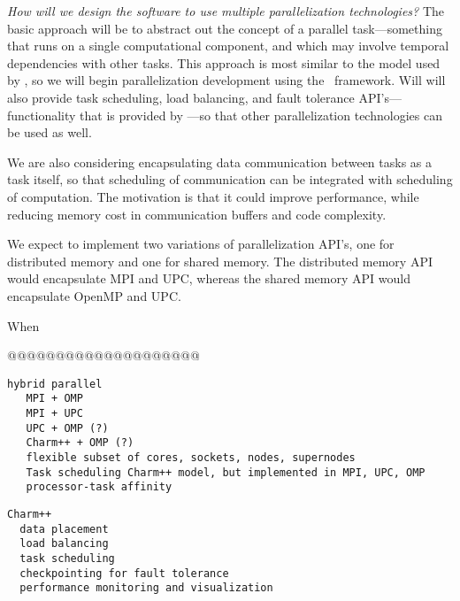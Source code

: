 \documentclass{article}
\begin{document}
\textit{How will we design the software to use multiple
  parallelization technologies?}  The basic approach will be to
abstract out the concept of a parallel task---something that runs on a
single computational component, and which may involve temporal
dependencies with other tasks.  This approach is most similar to the
model used by \charm, so we will begin parallelization development
using the \charm\ framework.  Will will also provide task scheduling,
load balancing, and fault tolerance API's---functionality that is
provided by \charm---so that other parallelization technologies can be
used as well.

We are also considering encapsulating data communication between tasks
as a task itself, so that scheduling of communication can be
integrated with scheduling of computation.  The motivation is that it
could improve performance, while reducing memory cost in communication
buffers and code complexity.

We expect to implement two variations of parallelization API's, one
for distributed memory and one for shared memory.  The distributed
memory API would encapsulate MPI and UPC, whereas the shared memory
API would encapsulate OpenMP and UPC.

When 

@@@@@@@@@@@@@@@@@@@@

\begin{verbatim}
hybrid parallel
   MPI + OMP
   MPI + UPC
   UPC + OMP (?)
   Charm++ + OMP (?)
   flexible subset of cores, sockets, nodes, supernodes
   Task scheduling Charm++ model, but implemented in MPI, UPC, OMP
   processor-task affinity
\end{verbatim}

\begin{verbatim}
Charm++ 
  data placement
  load balancing
  task scheduling
  checkpointing for fault tolerance
  performance monitoring and visualization
\end{verbatim}
\end{document}
